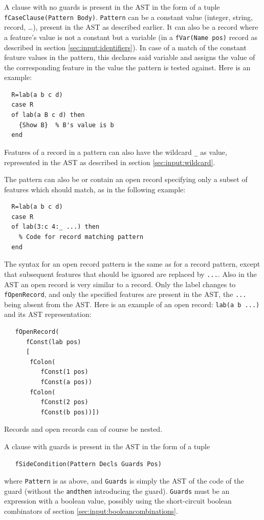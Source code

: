\documentclass[a4paper]{memoir}
\begin{document}
A clause with no guards is present in the AST in the form of a tuple \lstinline!fCaseClause(Pattern Body)!. \lstinline!Pattern! can be a constant value (integer, string, record, \ldots), present in the AST as described earlier. It can also be a record where a feature's value is not a constant but a variable (in a \lstinline!fVar(Name pos)! record as described in section \ref{sec:input:identifiers}). In case of a match of the constant feature values in the pattern, this declares said variable and assigns the value of the corresponding feature in the value the pattern is tested against. Here is an example:
\begin{lstlisting}
  R=lab(a b c d)
  case R
  of lab(a B c d) then
    {Show B}  % B's value is b
  end
\end{lstlisting}
Features of a record in a pattern can also have the wildcard \lstinline!_! as value, represented in the AST as described in section \ref{sec:input:wildcard}.

The pattern can also be or contain an open record specifying only a subset of features which should match, as in the following example:
\begin{lstlisting}
  R=lab(a b c d)
  case R
  of lab(3:c 4:_ ...) then
    % Code for record matching pattern
  end
\end{lstlisting}
The syntax for an open record pattern is the same as for a record pattern, except that subsequent features that should be ignored are replaced by \lstinline!...!. Also in the AST an open record is very similar to a record. Only the label changes to \lstinline!fOpenRecord!, and only the specified features are present in the AST, the \lstinline!...! being absent from the AST. Here is an example of an open record:
\lstinline!lab(a b ...)! 
and its AST representation:
\begin{lstlisting}
   fOpenRecord(
      fConst(lab pos)
      [
       fColon(
          fConst(1 pos)
          fConst(a pos))
       fColon(
          fConst(2 pos)
          fConst(b pos))])
\end{lstlisting}

Records and open records can of course be nested.

A clause with guards is present in the AST in the form of a tuple
\begin{lstlisting}
   fSideCondition(Pattern Decls Guards Pos)
\end{lstlisting}
where \lstinline!Pattern!
is as above,
and \lstinline!Guards! is simply the AST of the code of the guard (without the \lstinline!andthen! introducing the guard).
\lstinline!Guards! must be an expression with a boolean value, possibly using
the short-circuit boolean combinators of section \ref{sec:input:booleancombinations}.
\end{document}
